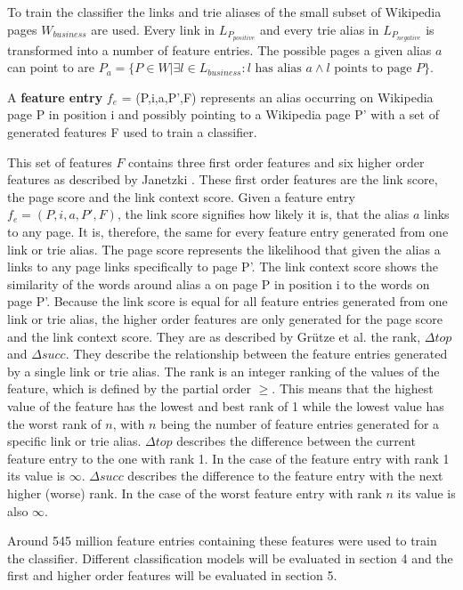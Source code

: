 To train the classifier the links and trie aliases of the small subset of Wikipedia pages $W_{business}$ are used. Every link in $L_{P_{positive}}$ and every trie alias in $L_{P_{negative}}$ is transformed into a number of feature entries. The possible pages a given alias $a$ can point to are $P_a = \{ P \in W | \exists l \in L_{business}: l \text{ has alias } a \land l \text{ points to page } P \}$.
\begin{definition}
A \textbf{feature entry} $f_e$ = (P,i,a,P',F) represents an alias occurring on Wikipedia page P in position i and possibly pointing to a Wikipedia page P' with a set of generated features F used to train a classifier.
\label{featureentry}
\end{definition}
This set of features $F$ contains three first order features and six higher order features as described by Janetzki \cite{janetzki}. These first order features are the link score, the page score and the link context score. Given a feature entry $f_e = (P,i,a,P',F)$, the link score signifies how likely it is, that the alias $a$ links to any page. It is, therefore, the same for every feature entry generated from one link or trie alias. The page score represents the likelihood that given the alias a links to any page links specifically to page P'. The link context score shows the similarity of the words around alias a on page P in position i to the words on page P'. Because the link score is equal for all feature entries generated from one link or trie alias, the higher order features are only generated for the page score and the link context score. They are as described by Grütze et al. \cite{coheel} the rank, $\Delta top$ and $\Delta succ$. They describe the relationship between the feature entries generated by a single link or trie alias. The rank is an integer ranking of the values of the feature, which is defined by the partial order $\geq$. This means that the highest value of the feature has the lowest and best rank of 1 while the lowest value has the worst rank of $n$, with $n$ being the number of feature entries generated for a specific link or trie alias. $\Delta top$ describes the difference between the current feature entry to the one with rank 1. In the case of the feature entry with rank 1 its value is $\infty$. $\Delta succ$ describes the difference to the feature entry with the next higher (worse) rank. In the case of the worst feature entry with rank $n$ its value is also $\infty$.\par
Around 545 million feature entries containing these features were used to train the classifier. Different classification models will be evaluated in section 4 and the first and higher order features will be evaluated in section 5.

